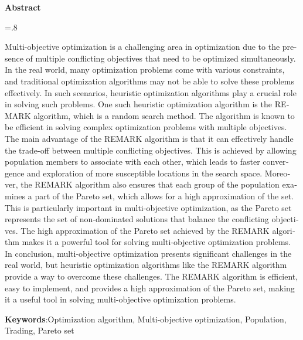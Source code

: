 


\pagestyle{empty}

\begin{latin}
	
	\begin{center}
		\textbf{Abstract}
	\end{center}
	\baselineskip=.8\baselineskip
	
	Multi-objective optimization is a challenging area in optimization due to the presence of multiple conflicting objectives that need to be optimized simultaneously. In the real world, many optimization problems come with various constraints, and traditional optimization algorithms may not be able to solve these problems effectively. In such scenarios, heuristic optimization algorithms play a crucial role in solving such problems.
	One such heuristic optimization algorithm is the REMARK algorithm, which is a random search method. The algorithm is known to be efficient in solving complex optimization problems with multiple objectives. The main advantage of the REMARK algorithm is that it can effectively handle the trade-off between multiple conflicting objectives. This is achieved by allowing population members to associate with each other, which leads to faster convergence and exploration of more susceptible locations in the search space.
	Moreover, the REMARK algorithm also ensures that each group of the population examines a part of the Pareto set, which allows for a high approximation of the set. This is particularly important in multi-objective optimization, as the Pareto set represents the set of non-dominated solutions that balance the conflicting objectives. The high approximation of the Pareto set achieved by the REMARK algorithm makes it a powerful tool for solving multi-objective optimization problems.
	In conclusion, multi-objective optimization presents significant challenges in the real world, but heuristic optimization algorithms like the REMARK algorithm provide a way to overcome these challenges. The REMARK algorithm is efficient, easy to implement, and provides a high approximation of the Pareto set, making it a useful tool in solving multi-objective optimization problems.
	
	\bigskip\noindent\textbf{Keywords}:Optimization algorithm, Multi-objective optimization, Population, Trading, Pareto set

	
\end{latin}

\newpage